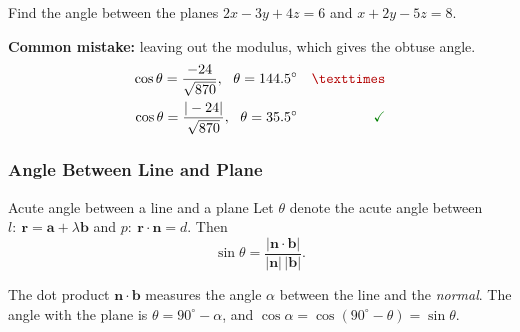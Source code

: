 \begin{example}[label=ex:5.15]
Find the angle between the planes $2x - 3y + 4z = 6$ and $x + 2y - 5z = 8$.
\end{example}

\begin{mistake}
\textbf{Common mistake:} leaving out the modulus, which gives the obtuse angle.
\begin{align*}
\cos\theta = \dfrac{-24}{\sqrt{870}},\ \ \theta = 144.5^{\circ} & & \wrong \\
\cos\theta = \dfrac{|-24|}{\sqrt{870}},\ \ \theta = 35.5^{\circ} & & \cmark
\end{align*}
\end{mistake}

\subsubsection*{Angle Between Line and Plane}
\begin{definition}{Acute angle between a line and a plane}
Let $\theta$ denote the acute angle between $l:\ \mathbf{r} = \mathbf{a} + \lambda\mathbf{b}$ and $p:\ \mathbf{r}\cdot\mathbf{n} = d$. Then
\[
\sin\theta = \dfrac{|\mathbf{n}\cdot\mathbf{b}|}{|\mathbf{n}|\,|\mathbf{b}|}.
\]
\end{definition}

\begin{center}
\end{center}
The dot product $\mathbf{n}\cdot\mathbf{b}$ measures the angle $\alpha$ between the line and the \emph{normal}. The angle with the plane is $\theta = 90^{\circ} - \alpha$, and $\cos\alpha = \cos(90^{\circ}-\theta) = \sin\theta$.

